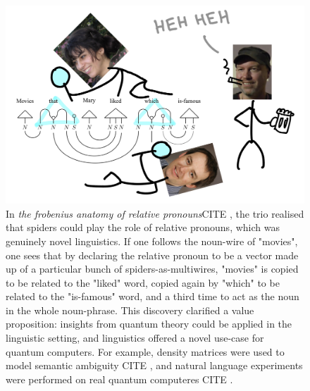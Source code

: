 \begin{figure}[h!]
\includegraphics{figures/cartoons/disco2}
\caption{In \emph{the frobenius anatomy of relative pronouns}\bR CITE \e, the trio realised that spiders could play the role of relative pronouns, which was genuinely novel linguistics. If one follows the noun-wire of "movies", one sees that by declaring the relative pronoun to be a vector made up of a particular bunch of spiders-as-multiwires, "movies" is copied to be related to the "liked" word, copied again by "which" to be related to the "is-famous" word, and a third time to act as the noun in the whole noun-phrase. This discovery clarified a value proposition: insights from quantum theory could be applied in the linguistic setting, and linguistics offered a novel use-case for quantum computers. For example, density matrices were used to model semantic ambiguity \bR CITE \e, and natural language experiments were performed on real quantum computeres \bR CITE \e.}
\end{figure}

